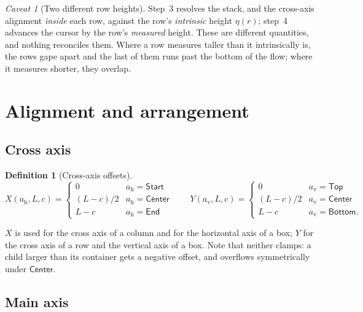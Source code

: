 \documentclass[11pt,a4paper]{article}
\newcommand{\Start}{\mathsf{Start}}
\newcommand{\Center}{\mathsf{Center}}
\newcommand{\End}{\mathsf{End}}
\newcommand{\Top}{\mathsf{Top}}
\newcommand{\Bottom}{\mathsf{Bottom}}
\theoremstyle{definition}
\newtheorem{definition}{Definition}[section]
\theoremstyle{plain}
\theoremstyle{remark}
\newtheorem{warning}{Caveat}[section]
\begin{document}
\begin{warning}[Two different row heights]
Step~3 resolves the stack, and the cross-axis alignment \emph{inside} each row,
against the row's \emph{intrinsic} height $\eta(r)$; step~4 advances the cursor
by the row's \emph{measured} height. These are different quantities, and nothing
reconciles them. Where a row measures taller than it intrinsically is, the rows
gape apart and the last of them runs past the bottom of the flow; where it
measures shorter, they overlap.
\end{warning}

\section{Alignment and arrangement}

\subsection{Cross axis}
\label{sec:cross}

\begin{definition}[Cross-axis offsets]
\[
  X(a_{\mathrm{h}}, L, c) = \begin{cases}
    0 & a_{\mathrm{h}} = \Start \\
    (L - c)/2 & a_{\mathrm{h}} = \Center \\
    L - c & a_{\mathrm{h}} = \End
  \end{cases}
  \qquad
  Y(a_{\mathrm{v}}, L, c) = \begin{cases}
    0 & a_{\mathrm{v}} = \Top \\
    (L - c)/2 & a_{\mathrm{v}} = \Center \\
    L - c & a_{\mathrm{v}} = \Bottom .
  \end{cases}
\]
\end{definition}

$X$ is used for the cross axis of a column and for the horizontal axis of a box;
$Y$ for the cross axis of a row and the vertical axis of a box. Note that
neither clamps: a child larger than its container gets a negative offset, and
overflows symmetrically under $\Center$.

\subsection{Main axis}
\label{sec:arrange}
\end{document}
